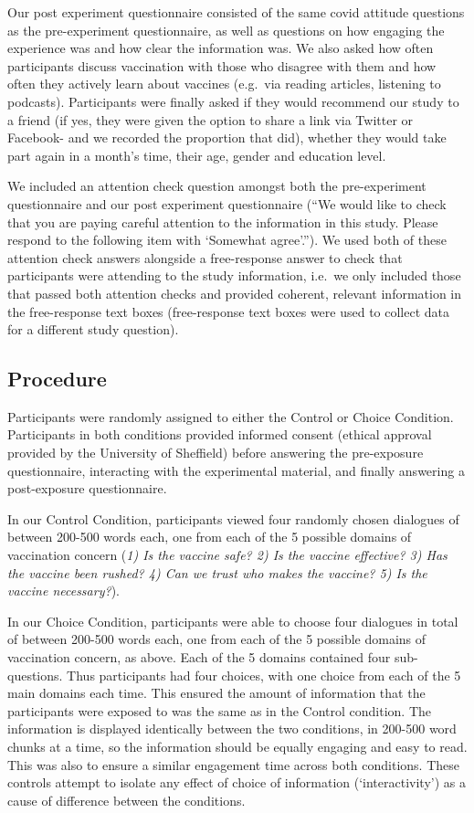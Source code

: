 \documentclass[
  english,
  ,jou,floatsintext]{apa6}
\begin{document}
Our post experiment questionnaire consisted of the same covid attitude questions as the pre-experiment questionnaire, as well as questions on how engaging the experience was and how clear the information was. We also asked how often participants discuss vaccination with those who disagree with them and how often they actively learn about vaccines (e.g.~via reading articles, listening to podcasts). Participants were finally asked if they would recommend our study to a friend (if yes, they were given the option to share a link via Twitter or Facebook- and we recorded the proportion that did), whether they would take part again in a month's time, their age, gender and education level.

We included an attention check question amongst both the pre-experiment questionnaire and our post experiment questionnaire (``We would like to check that you are paying careful attention to the information in this study. Please respond to the following item with `Somewhat agree'.''). We used both of these attention check answers alongside a free-response answer to check that participants were attending to the study information, i.e.~we only included those that passed both attention checks and provided coherent, relevant information in the free-response text boxes (free-response text boxes were used to collect data for a different study question).

\hypertarget{procedure}{%
\subsection{Procedure}\label{procedure}}

Participants were randomly assigned to either the Control or Choice Condition. Participants in both conditions provided informed consent (ethical approval provided by the University of Sheffield) before answering the pre-exposure questionnaire, interacting with the experimental material, and finally answering a post-exposure questionnaire.

In our Control Condition, participants viewed four randomly chosen dialogues of between 200-500 words each, one from each of the 5 possible domains of vaccination concern (\emph{1) Is the vaccine safe? 2) Is the vaccine effective? 3) Has the vaccine been rushed? 4) Can we trust who makes the vaccine? 5) Is the vaccine necessary?}).

In our Choice Condition, participants were able to choose four dialogues in total of between 200-500 words each, one from each of the 5 possible domains of vaccination concern, as above. Each of the 5 domains contained four sub-questions. Thus participants had four choices, with one choice from each of the 5 main domains each time. This ensured the amount of information that the participants were exposed to was the same as in the Control condition. The information is displayed identically between the two conditions, in 200-500 word chunks at a time, so the information should be equally engaging and easy to read. This was also to ensure a similar engagement time across both conditions. These controls attempt to isolate any effect of choice of information (`interactivity') as a cause of difference between the conditions.
\end{document}
